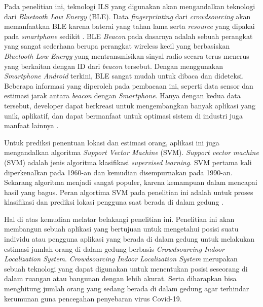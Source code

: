\par Pada penelitian ini, teknologi ILS yang digunakan akan mengandalkan teknologi  dari \textit{Bluetooth Low Energy} (BLE). Data \textit{fingerprinting} dari \textit{crowdsourcing} akan memanfaatkan BLE karena baterai yang tahan lama serta \textit{resource} yang dipakai pada \textit{smartphone} sedikit \citep{Wan2019}. BLE \textit{Beacon} pada dasarnya adalah sebuah perangkat yang sangat sederhana berupa perangkat wireless kecil yang berbasiskan \textit{Bluetooth Low Energy} yang mentransmisikan sinyal radio secara terus menerus yang berkaitan dengan ID dari \textit{beacon} tersebut. Dengan menggunakan \textit{Smartphone Android} terkini, BLE sangat mudah untuk dibaca dan dideteksi. Beberapa informasi yang diperoleh pada pembacaan ini, seperti data sensor dan estimasi jarak antara \textit{beacon} dengan \textit{Smartphone}. Hanya dengan kedua data tersebut, developer dapat berkreasi untuk mengembangkan banyak aplikasi yang unik, aplikatif, dan dapat bermanfaat untuk optimasi sistem di industri juga manfaat lainnya \citep{Sun2019}.

\par Untuk prediksi penentuan lokasi dan estimasi orang, aplikasi ini juga mengandalkan algoritma \textit{Support Vector Machine} (SVM). \textit{Support vector machine} (SVM) adalah jenis algoritma klasifikasi \textit{supervised learning}. SVM pertama kali diperkenalkan pada 1960-an dan kemudian disempurnakan pada 1990-an. Sekarang algoritma menjadi sangat populer, karena kemampuan dalam mencapai hasil yang bagus. Peran algortima SVM pada penelitian ini adalah untuk proses klasifikasi dan prediksi lokasi pengguna saat berada di dalam gedung \citep{Zhibin2008}.

\par Hal di atas kemudian melatar belakangi penelitian ini. Penelitian ini akan membangun sebuah aplikasi yang bertujuan untuk mengetahui posisi suatu individu atau pengguna aplikasi yang berada di dalam gedung untuk melakukan estimasi jumlah orang di dalam gedung berbasis \textit{Crowdsourcing Indoor Localization System}. \textit{Crowdsourcing Indoor Localization System} merupakan   sebuah   teknologi   yang   dapat digunakan  untuk  menentukan  posisi  seseorang  di  dalam  ruangan  atau  bangunan dengan lebih akurat. Serta diharapkan bisa menghitung jumlah orang yang sedang berada di dalam gedung agar terhindar kerumunan guna pencegahan penyebaran virus Covid-19.



\fancyhf{}
\fancyfoot[R]{\thepage}


